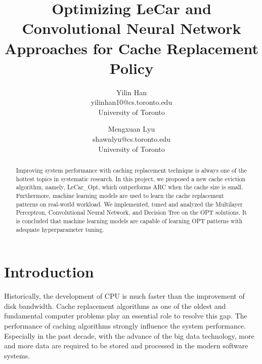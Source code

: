 \documentclass[letterpaper,twocolumn,10pt]{article}
\begin{document}

\date{}

\title{\Large \bf Optimizing LeCar and Convolutional Neural Network Approaches for Cache Replacement Policy}

\author{
{\rm Yilin Han}\\
yilinhan10@cs.toronto.edu\\
University of Toronto
\and
{\rm Mengxuan Lyu}\\
shawnlyu@cs.toronto.edu\\
University of Toronto
} %

\maketitle

\begin{abstract}
Improving system performance with caching replacement technique is always one of the hottest topics in systematic research. In this project, we proposed a new cache eviction algorithm, namely, LeCar\_Opt, which outperforms ARC when the cache size is small. Furthermore, machine learning models are used to learn the cache replacement patterns on real-world workload. We implemented, tuned and analyzed the Multilayer Perceptron, Convolutional Neural Network, and Decision Tree on the OPT solutions. It is concluded that machine learning models are capable of learning OPT patterns with adequate hyperparameter tuning.


\end{abstract}


\section{Introduction}

Historically, the development of CPU is much faster than the improvement of disk bandwidth. Cache replacement algorithms as one of the oldest and fundamental computer problems play an essential role to resolve this gap. The performance of caching algorithms strongly influence the system performance. Especially in the past decade,  with the advance of the big data technology, more and more data are required to be stored and processed in the modern software systems. 
\end{document}
